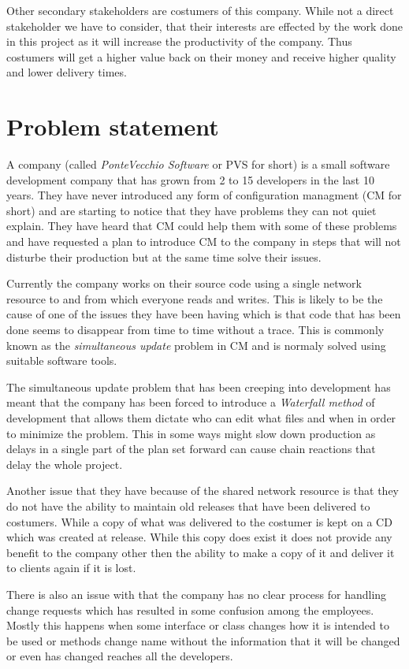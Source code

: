 \documentclass[a4paper]{article}
\begin{document}
Other secondary stakeholders are costumers of this company. While not a direct stakeholder we have to consider, that their interests are effected by the work done in this project as it will increase the productivity of the company. Thus costumers will get a higher value back on their money and receive higher quality and lower delivery times.

\section{Problem statement}
A company (called \emph{PonteVecchio Software} or PVS for short) is a small software development company that has grown from 2 to 15 developers in the last 10 years. They have never introduced any form of configuration managment (CM for short) and are starting to notice that they have problems they can not quiet explain. They have heard that CM could help them with some of these problems and have requested a plan to introduce CM to the company in steps that will not disturbe their production but at the same time solve their issues.

Currently the company works on their source code using a single network resource to and from which everyone reads and writes. This is likely to be the cause of one of the issues they have been having which is that code that has been done seems to disappear from time to time without a trace. This is commonly known as the \emph{simultaneous update} problem in CM and is normaly solved using suitable software tools.

The simultaneous update problem that has been creeping into development has meant that the company has been forced to introduce a \emph{Waterfall method} of development that allows them dictate who can edit what files and when in order to minimize the problem. This in some ways might slow down production as delays in a single part of the plan set forward can cause chain reactions that delay the whole project.

Another issue that they have because of the shared network resource is that they do not have the ability to maintain old releases that have been delivered to costumers. While a copy of what was delivered to the costumer is kept on a CD which was created at release. While this copy does exist it does not provide any benefit to the company other then the ability to make a copy of it and deliver it to clients again if it is lost.

There is also an issue with that the company has no clear process for handling change requests which has resulted in some confusion among the employees. Mostly this happens when some interface or class changes how it is intended to be used or methods change name without the information that it will be changed or even has changed reaches all the developers.
\end{document}
